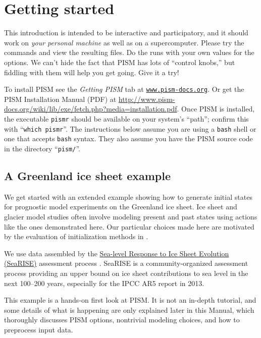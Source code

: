 \section{Getting started}\label{sec:start}

This introduction is intended to be interactive and participatory, and it should work on \emph{your personal machine} as well as on a supercomputer.  Please try the commands and view the resulting files.  Do the runs with your own values for the options.  We can't hide the fact that PISM has lots of ``control knobs,'' but fiddling with them will help you get going.  Give it a try!

To install PISM see the \emph{Getting PISM} tab at \href{http://www.pism-docs.org}{\texttt{www.pism-docs.org}}.  Or get the PISM Installation Manual (PDF) at \url{http://www.pism-docs.org/wiki/lib/exe/fetch.php?media=installation.pdf}.  Once PISM is installed, the executable \texttt{pismr} should be available on your system's ``path''; confirm this with ``\texttt{which pismr}''.  The instructions below assume you are using a \texttt{bash} shell or one that accepts \texttt{bash} syntax.  They also assume you have the PISM source code in the directory ``\texttt{pism/}''.

\subsection{A Greenland ice sheet example}

We get started with an extended example showing how to generate initial states for prognostic model experiments on the Greenland ice sheet.  Ice sheet and glacier model studies often involve modeling present and past states using actions like the ones demonstrated here.  Our particular choices made here are motivated by the evaluation of initialization methods in \cite{AschwandenAdalgeirsdottirKhroulev}.

We use data assembled by the \href{http://websrv.cs.umt.edu/isis/index.php/SeaRISE_Assessment}{Sea-level Response to Ice Sheet Evolution (SeaRISE)} assessment process \cite{Bindschadler2013SeaRISE}.  SeaRISE is a community-organized assessment process providing an upper bound on ice sheet contributions to sea level in the next 100--200 years, especially for the IPCC AR5 report in 2013.

This example is a hands-on first look at PISM.  It is not an in-depth tutorial, and some details of what is happening are only explained later in this Manual, which thoroughly discusses PISM options, nontrivial modeling choices, and how to preprocess input data.

